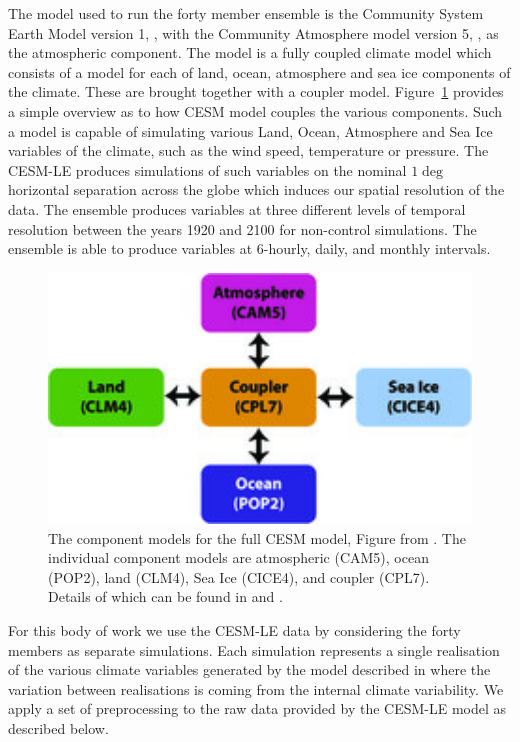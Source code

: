  The model used to run the forty member ensemble is the Community System Earth Model version 1, \citep{hurrell_community_2013}, with the Community Atmosphere model version 5, \citep{hurrell_community_2013}, as the atmospheric component.
 The model is a fully coupled climate model which consists of a model for each of land, ocean, atmosphere and sea ice components of the climate.
 These are brought together with a coupler model.
 Figure~\ref{fig:cesm} provides a simple overview as to how CESM model couples the various components.
 Such a model is capable of simulating various Land, Ocean, Atmosphere and Sea Ice variables of the climate, such as the wind speed, temperature or pressure.
 The CESM-LE produces simulations of such variables on the nominal $1\deg$ horizontal separation across the globe which induces our spatial resolution of the data.
 The ensemble produces variables at three different levels of temporal resolution between the years 1920 and 2100 for non-control simulations. The ensemble is able to produce variables at 6-hourly, daily, and monthly intervals. 
 
 \begin{figure}[htbp!] 
 	\centering    
 	\includegraphics[width=1.0\textwidth]{cesm_components}
 	\caption[CESM component models]{The component models for the full CESM model, Figure from \citep{kay_community_2015}. The individual component models are atmospheric (CAM5), ocean (POP2), land (CLM4), Sea Ice (CICE4), and coupler (CPL7). Details of which can be found in \citep{kay_community_2015} and \citep{hurrell_community_2013}.}
 	\label{fig:cesm}
 \end{figure}

 For this body of work we use the CESM-LE data by considering the forty members as separate simulations.
 Each simulation represents a single realisation of the various climate variables generated by the model described in \citep{kay_community_2015} where the variation between realisations is coming from the internal climate variability. 
 We apply a set of preprocessing to the raw data provided by the CESM-LE model as described below. 
 

